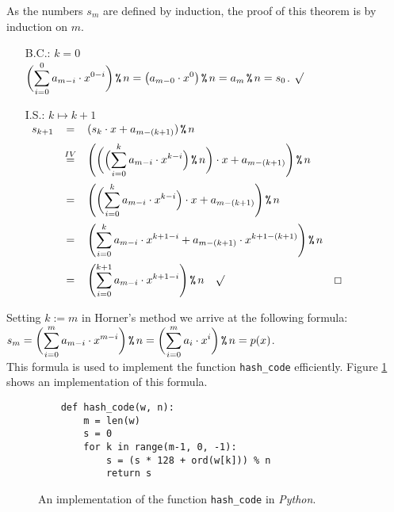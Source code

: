 \proof
As the numbers $s_m$ are defined by induction, the proof of this theorem is by
induction on $m$.
\begin{enumerate}
\item[B.C.:] $k = 0$
             \\[0.2cm]
             \hspace*{1.3cm}
           $\displaystyle\biggl(\sum\limits_{i=0}^0 a_{m-i} \cdot x^{0-i}\biggr) \,\texttt{\%}\, n = \bigl(a_{m-0} \cdot x^0
          \bigr)\,\texttt{\%}\, n = a_m \,\texttt{\%}\, n = s_0$. $\surd$
\item[I.S.:] $k \mapsto k + 1$
             \\[0.2cm]
             \hspace*{1.3cm}
             $
             \begin{array}{lcll}
               s_{k+1} & = & (s_k \cdot x + a_{m - (k+1)} ) \,\texttt{\%}\, n \\[0.2cm]
                      & \stackrel{IV}{=} & \displaystyle\Biggl(\biggl(\Bigl(\sum\limits_{i=0}^k a_{m-i} \cdot x^{k-i} \Bigr) \,\texttt{\%}\, n\biggr) \cdot x + a_{m - (k+1)}\Biggr) \,\texttt{\%}\, n
                                         \\[0.5cm]
                      & = & \displaystyle\Biggl(\biggl(\sum\limits_{i=0}^k a_{m-i} \cdot x^{k-i} \Bigr) \cdot x + a_{m - (k+1)}\Biggr) \,\texttt{\%}\, n
                            \\[0.5cm]
                      & = & \displaystyle\Biggl(\sum\limits_{i=0}^k a_{m-i} \cdot x^{k+1-i}  + a_{m - (k+1)} \cdot x^{k+1-(k+1)}\Biggr) \,\texttt{\%}\, n
                            \\[0.5cm]
                      & = & \displaystyle\Biggl(\sum\limits_{i=0}^{k+1} a_{m-i} \cdot x^{k+1-i}  \Biggr) \,\texttt{\%}\, n \quad \surd & \Box
             \end{array}
             $
\end{enumerate}
Setting $k := m$ in Horner's method we arrive at the following formula:
\\[0.2cm]
\hspace*{1.3cm}
$\displaystyle s_m = \biggl(\sum\limits_{i=0}^m a_{m - i} \cdot x^{m - i}\biggr) \,\texttt{\%}\, n = \biggl(\sum\limits_{i=0}^m a_{i} \cdot x^{i}\biggr) \,\texttt{\%}\, n = p(x)$.
\\[0.2cm]
This formula is used to implement the function \texttt{hash\_code} efficiently.
Figure \ref{fig:hash_code.py} shows an implementation of this formula.

\begin{figure}[!ht]
\centering
\begin{verbatim}
    def hash_code(w, n):
        m = len(w)
        s = 0
        for k in range(m-1, 0, -1):
            s = (s * 128 + ord(w[k])) % n
            return s
\end{verbatim}
\vspace*{-0.3cm}
\caption{An implementation of the function \texttt{hash\_code} in \textsl{Python}.}
\label{fig:hash_code.py}
\end{figure}


